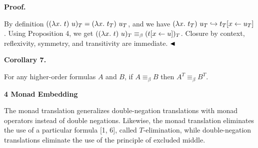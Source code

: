  
 
 
 
\par\medskip\noindent\textbf{Proof.}\par
 
 
By definition $((\lambda x.\leavevmode\nobreak\ t)\leavevmode\nobreak\ u)_{T}=(\lambda x.\leavevmode\nobreak\ t_{T})\leavevmode\nobreak\ u_{T}$, and we have $(\lambda x.\leavevmode\nobreak\ t_{T})\leavevmode\nobreak\ u_{T}\hookrightarrow t_{T}[x\leftarrow u_{T}]$. Using Proposition 4, we get $((\lambda x.\leavevmode\nobreak\ t)\leavevmode\nobreak\ u)_{T}\equiv_{\beta}(t[x\leftarrow u])_{T}$. Closure by context, reflexivity, symmetry, and transitivity are immediate. $\hfill\blacktriangleleft$\par
 
 
 
\par\medskip\noindent\textbf{Corollary 7.}\par
 
 
For any higher-order formulas $A$ and $B$, if $A\equiv_{\beta}B$ then $A^{T}\equiv_{\beta}B^{T}$.\par
 
 
 
 


 
\par\medskip\noindent\textbf{4 Monad Embedding}\par
 
 
The monad translation generalizes double-negation translations with monad operators instead of double negations. Likewise, the monad translation eliminates the use of a particular formula [1, 6], called $T$-elimination, while double-negation translations eliminate the use of the principle of excluded middle.\par
 
\begin{center}\end{center}
 
